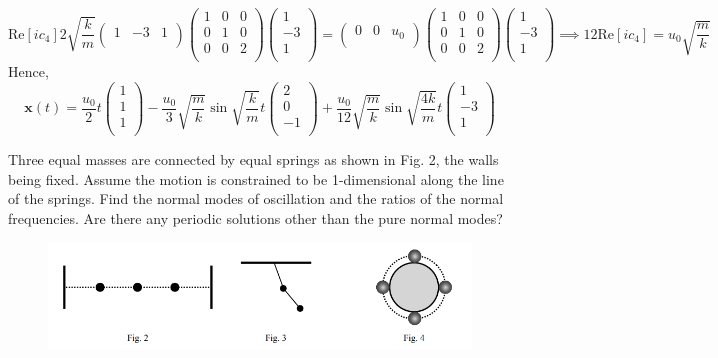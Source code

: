 \documentclass[a4paper]{article}
\begin{document}
\begin{ans}
$$\text{Re}[ic_4]2\sqrt{\frac{k}{m}}\begin{pmatrix}1&-3&1\\\end{pmatrix}\begin{pmatrix}1&0&0\\0&1&0\\0&0&2\\\end{pmatrix}\begin{pmatrix}1\\-3\\1\\\end{pmatrix}=\begin{pmatrix}0&0&u_0\\\end{pmatrix}\begin{pmatrix}1&0&0\\0&1&0\\0&0&2\\\end{pmatrix}\begin{pmatrix}1\\-3\\1\\\end{pmatrix}\implies 12\text{Re}[ic_4]=u_0\sqrt{\frac{m}{k}}$$
Hence,
$$\mathbf{x}(t)=\frac{u_0}{2}t\begin{pmatrix}1\\1\\1\\\end{pmatrix}-\frac{u_0}{3}\sqrt{\frac{m}{k}}\sin\sqrt{\frac{k}{m}}t\begin{pmatrix}2\\0\\-1\\\end{pmatrix}+\frac{u_0}{12}\sqrt{\frac{m}{k}}\sin\sqrt{\frac{4k}{m}}t\begin{pmatrix}1\\-3\\1\\\end{pmatrix}$$
\end{ans}
\newpage
\begin{qns}
Three equal masses are connected by equal springs as shown in Fig. 2, the walls being fixed. Assume the motion is constrained to be 1-dimensional along the line of the springs. Find the normal modes of oscillation and the ratios of the normal frequencies. Are there any periodic solutions other than the pure normal modes?
\begin{figure}[H]
    \centering
    \includegraphics[width=\linewidth]{EEx1Q.PNG}
\end{figure}
\end{qns}
\end{document}
